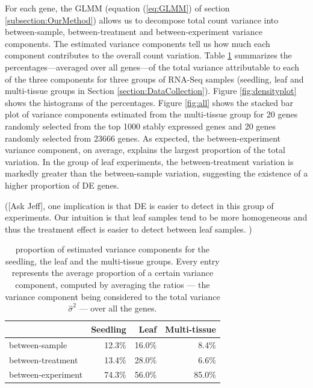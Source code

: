 \documentclass[11pt, a4paper]{article}
\begin{document}
For each gene, the GLMM (equation (\ref{eq:GLMM}) of section
\ref{subsection:OurMethod}) allows us to decompose total count variance into
between-sample, between-treatment and between-experiment variance components.
The estimated variance components tell us how much each component contributes
to the overall count variation. Table \ref{table:percentageofvariation}
summarizes the percentages---averaged over all genes---of the total variance
attributable to each of the three components for three groups of RNA-Seq
samples (seedling, leaf and multi-tissue groups in Section \ref{section:DataCollection}). Figure \ref{fig:densityplot}
shows the histograms of the percentages. 
Figure \ref{fig:all} shows the stacked bar plot of variance components 
estimated from the multi-tissue group for 20
genes randomly selected from the top 1000 stably expressed genes 
and 20 genes randomly selected from 23666 genes. 
As expected, the between-experiment variance component, on average, explains
the largest proportion of the total variation. In the group of leaf
experiments, the between-treatment variation is markedly greater than the
between-sample variation, suggesting the existence of a higher proportion of DE genes.

([Ask Jeff], one implication is that DE is easier to detect in
this group of experiments.  
 Our intuition is that leaf samples tend
to be more homogeneous and thus the treatment effect is easier to detect
between leaf samples. ) 
 
 \begin{center} \begin{table}[h!] \centering \caption{proportion of estimated
     variance components for the seedling, the leaf and the multi-tissue groups. Every entry represents the average proportion of a certain variance component, computed by averaging the ratios --- the variance component being considered to the total variance $\hat{\sigma}^2$ --- over all the genes.} \label{table:percentageofvariation}
     \begin{tabular}{lrrr}\hline & Seedling & Leaf & Multi-tissue \\  \hline
	 between-sample     & 12.3\%   & 16.0\% & 8.4\%           \\
	 between-treatment  & 13.4\%   & 28.0\% & 6.6\%           \\
	 between-experiment & 74.3\%   & 56.0\% & 85.0\%         \\ \hline
     \end{tabular} \end{table} \end{center}
\end{document}
